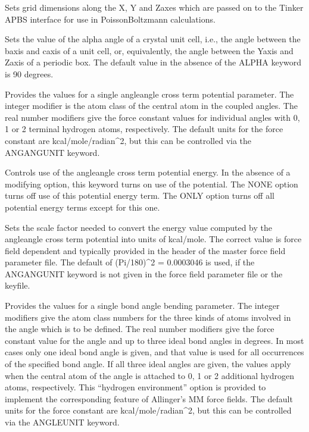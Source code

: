 \documentclass[letterpaper,11pt,english]{sphinxmanual}
\begin{document}
  Sets grid dimensions along the X\sphinxhyphen{}, Y\sphinxhyphen{} and Z\sphinxhyphen{}axes which are passed on to the Tinker APBS interface for use in Poisson\sphinxhyphen{}Boltzmann calculations.

  Sets the value of the alpha angle of a crystal unit cell, i.e., the angle between the b\sphinxhyphen{}axis and c\sphinxhyphen{}axis of a unit cell, or, equivalently, the angle between the Y\sphinxhyphen{}axis and Z\sphinxhyphen{}axis of a periodic box. The default value in the absence of the ALPHA keyword is 90 degrees.

  Provides the values for a single angle\sphinxhyphen{}angle cross term potential parameter. The integer modifier is the atom class of the central atom in the coupled angles. The real number modifiers give the force constant values for individual angles with 0, 1 or 2 terminal hydrogen atoms, respectively. The default units for the force constant are kcal/mole/radian\textasciicircum{}2, but this can be controlled via the ANGANGUNIT keyword.

  Controls use of the angle\sphinxhyphen{}angle cross term potential energy. In the absence of a modifying option, this keyword turns on use of the potential. The NONE option turns off use of this potential energy term. The ONLY option turns off all potential energy terms except for this one.

  Sets the scale factor needed to convert the energy value computed by the angle\sphinxhyphen{}angle cross term potential into units of kcal/mole. The correct value is force field dependent and typically provided in the header of the master force field parameter file. The default of (Pi/180)\textasciicircum{}2 = 0.0003046 is used, if the ANGANGUNIT keyword is not given in the force field parameter file or the keyfile.


  Provides the values for a single bond angle bending parameter. The integer modifiers give the atom class numbers for the three kinds of atoms involved in the angle which is to be defined. The real number modifiers give the force constant value for the angle and up to three ideal bond angles in degrees. In most cases only one ideal bond angle is given, and that value is used for all occurrences of the specified bond angle. If all three ideal angles are given, the values apply when the central atom of the angle is attached to 0, 1 or 2 additional hydrogen atoms, respectively. This “hydrogen environment” option is provided to implement the corresponding feature of Allinger’s MM force fields. The default units for the force constant are kcal/mole/radian\textasciicircum{}2, but this can be controlled via the ANGLEUNIT keyword.
\end{document}
